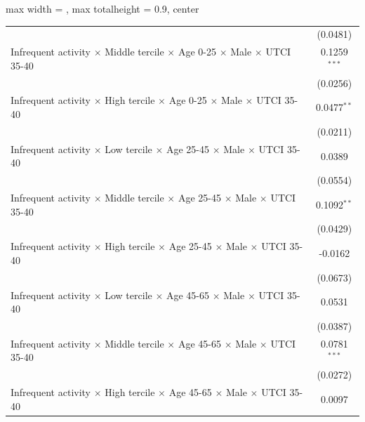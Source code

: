 \begin{table}[htbp]
\begin{adjustbox}{max width = \textwidth, max totalheight = 0.9\textheight, center}
\begin{tabular}{lc}
                                                                                                                 & (0.0481)\\   
         Infrequent activity $\times$ Middle tercile $\times$ Age 0-25 $\times$ Male $\times$ UTCI 35-40         & 0.1259$^{***}$\\   
                                                                                                                 & (0.0256)\\   
         Infrequent activity $\times$ High tercile $\times$ Age 0-25 $\times$ Male $\times$ UTCI 35-40           & 0.0477$^{**}$\\   
                                                                                                                 & (0.0211)\\   
         Infrequent activity $\times$ Low tercile $\times$ Age 25-45 $\times$ Male $\times$ UTCI 35-40           & 0.0389\\   
                                                                                                                 & (0.0554)\\   
         Infrequent activity $\times$ Middle tercile $\times$ Age 25-45 $\times$ Male $\times$ UTCI 35-40        & 0.1092$^{**}$\\   
                                                                                                                 & (0.0429)\\   
         Infrequent activity $\times$ High tercile $\times$ Age 25-45 $\times$ Male $\times$ UTCI 35-40          & -0.0162\\   
                                                                                                                 & (0.0673)\\   
         Infrequent activity $\times$ Low tercile $\times$ Age 45-65 $\times$ Male $\times$ UTCI 35-40           & 0.0531\\   
                                                                                                                 & (0.0387)\\   
         Infrequent activity $\times$ Middle tercile $\times$ Age 45-65 $\times$ Male $\times$ UTCI 35-40        & 0.0781$^{***}$\\   
                                                                                                                 & (0.0272)\\   
         Infrequent activity $\times$ High tercile $\times$ Age 45-65 $\times$ Male $\times$ UTCI 35-40          & 0.0097\\   

\end{tabular}
\end{adjustbox}
\end{table}
